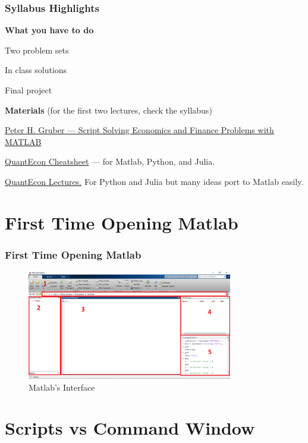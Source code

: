 \documentclass[11pt,xcolor={svgnames},aspectratio=169,usepdftitle=false]{beamer}
\let\toneitemize\itemize
\let\ttwoitemize\enditemize
\renewenvironment{itemize}{\toneitemize\addtolength{\itemsep}{1.35\baselineskip}}{\ttwoitemize}
\let\toneenumer\enumerate
\let\ttwoenumer\endenumerate
\renewenvironment{enumerate}{\toneenumer\addtolength{\itemsep}{1.35\baselineskip}}{\ttwoenumer}
\begin{document}
\begin{frame}
    \frametitle{Syllabus Highlights}
    \textbf{\alert{What you have to do}}
    \begin{enumerate}
        \item Two problem sets
        \item In class solutions
        \item Final project
    \end{enumerate}
    
    \textbf{\alert{Materials}} (for the first two lectures, check the syllabus)
    \begin{itemize}
        \item \href{https://people.lu.usi.ch/gruberp/MatlabMasterScript.pdf}{Peter H. Gruber --- Script Solving Economics and Finance Problems with MATLAB}
        \item \href{https://cheatsheets.quantecon.org/index.html}{QuantEcon Cheatsheet} ---  for Matlab, Python, and Julia.
        \item \href{https://quantecon.org/lectures/}{QuantEcon Lectures.} For Python and Julia but many ideas port to Matlab easily.
    \end{itemize}
\end{frame}

\section{First Time Opening Matlab}

\begin{frame}
    \frametitle{First Time Opening Matlab}
\begin{figure}
    \centering
    \includegraphics[width = 0.8\textwidth]{../figures/matlab_initial.PNG}
    \caption{Matlab's Interface}
    \label{fig:matlab_interface}
\end{figure}
\end{frame}

\section{Scripts vs Command Window}
\end{document}
